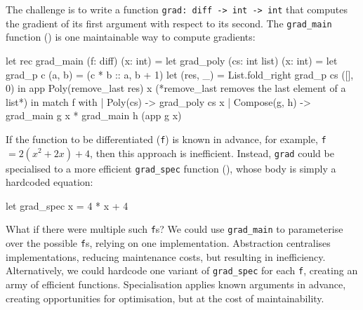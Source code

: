 The challenge is to write a function \texttt{grad: diff -> int -> int} that computes the gradient of its first argument with respect to its second. The \texttt{grad_main} function () is one maintainable way to compute gradients: 

\begin{code}
\begin{ocamllst}
let rec grad_main (f: diff) (x: int) = 
  let grad_poly (cs: int list) (x: int) = 
    let grad_p c (a, b) = (c * b :: a, b + 1) 
    let (res, _) = List.fold_right grad_p cs ([], 0) in 
    app Poly(remove_last res) x (*remove_last removes the last element of a list*)
  in match f with
    | Poly(cs)      -> grad_poly cs x
    | Compose(g, h) -> grad_main g x * grad_main h (app g x)

\end{ocamllst}
%
\label{listing:ocaml-grad-main}
\end{code}


If the function to be differentiated (\texttt{f}) is known in advance, for example, \texttt{f} $= 2(x^2 + 2x) + 4$, then this approach is inefficient. Instead, \texttt{grad} could be specialised to a more efficient \texttt{grad_spec} function (), whose body is simply a hardcoded equation:

\begin{code}
\begin{ocamllst}
let grad_spec x = 4 * x + 4
\end{ocamllst}
\label{listing:ocaml-grad-fast}
\end{code}    

What if there were multiple such \texttt{f}s? We could use \texttt{grad_main} to parameterise over the possible \texttt{f}s, relying on one implementation. Abstraction centralises implementations, reducing maintenance costs, but resulting in inefficiency. Alternatively, we could hardcode one variant of \texttt{grad_spec} for each \texttt{f}, creating an army of efficient functions. Specialisation applies known arguments in advance, creating opportunities for optimisation, but at the cost of maintainability. 


